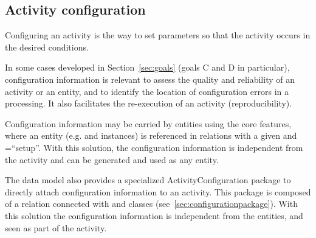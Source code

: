 
\subsection{Activity configuration}
\label{sec:configuration}

Configuring an activity is the way to set parameters so that the activity occurs in the desired conditions.

In some cases developed in Section~\ref{sec:goals} (goals C and D in particular), configuration information is relevant to assess the quality and reliability of an activity or an entity, and to identify the location of configuration errors in a processing. It also facilitates the re-execution of an activity (reproducibility).

Configuration information may be carried by entities using the core features, where an entity (e.g.  and  instances) is referenced in  relations with a given  and =“setup”. With this solution, the configuration information is independent from the activity and can be generated and used as any entity.

The data model also provides a specialized ActivityConfiguration package to directly attach configuration information to an activity. This package is composed of a  relation connected with  and  classes (see~\ref{sec:configurationpackage}). With this solution the configuration information is independent from the entities, and seen as part of the activity.







